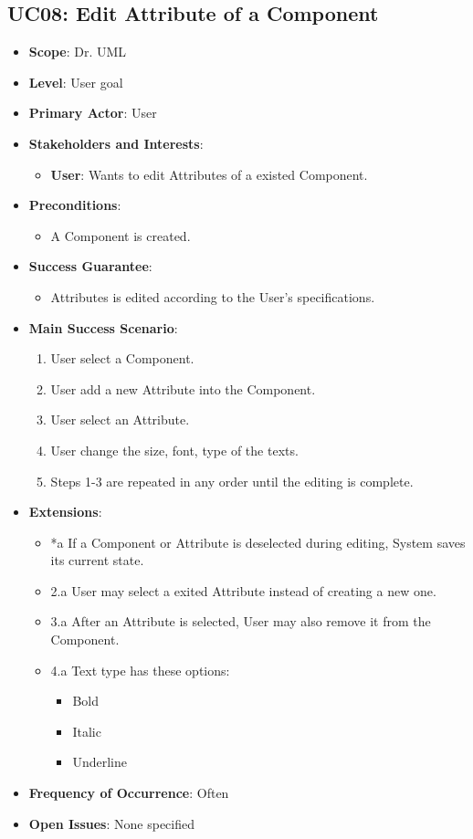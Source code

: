 \documentclass[12pt]{article}
\begin{document}
\subsection{UC08: Edit Attribute of a Component}
\begin{itemize}
    \item \textbf{Scope}: Dr. UML
    \item \textbf{Level}: User goal
    \item \textbf{Primary Actor}: User
    \item \textbf{Stakeholders and Interests}:
    \begin{itemize}
        \item \textbf{User}: Wants to edit Attributes of a existed Component.
    \end{itemize}
    \item \textbf{Preconditions}:
    \begin{itemize}
        \item A Component is created.
    \end{itemize}
    \item \textbf{Success Guarantee}:
        \begin{itemize}
            \item Attributes is edited according to the User’s specifications.
        \end{itemize}
    \item \textbf{Main Success Scenario}:
    \begin{enumerate}
        \item User select a Component.
        \item User add a new Attribute into the Component.
        \item User select an Attribute.
        \item User change the size, font, type of the texts.
        \item Steps 1-3 are repeated in any order until the editing is complete.
    \end{enumerate}
    \item \textbf{Extensions}:
    \begin{itemize}
        \item *a If a Component or Attribute is deselected during editing, System saves its current state.
        \item 2.a User may select a exited Attribute instead of creating a new one.
        \item 3.a After an Attribute is selected, User may also remove it from the Component.
        \item 4.a Text type has these options:
        \begin{itemize}
            \item Bold
            \item Italic
            \item Underline
        \end{itemize}
    \end{itemize}
    \item \textbf{Frequency of Occurrence}: Often
    \item \textbf{Open Issues}: None specified
\end{itemize}
\end{document}
